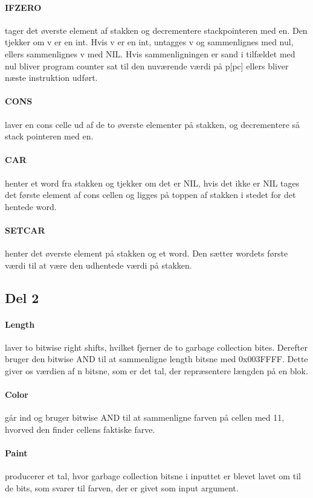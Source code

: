 \paragraph{IFZERO} tager det øverste element af stakken og decrementere stackpointeren med en. Den tjekker om v er en int. Hvis v er en int, untagges v og sammenlignes med nul, ellers sammenlignes v med NIL. Hvis sammenligningen er sand i tilfældet med nul bliver program counter sat til den nuværende værdi på p[pc] ellers bliver næste instruktion udført.
\paragraph{CONS} laver en cons celle ud af de to øverste elementer på stakken, og decrementere så stack pointeren med en.
\paragraph{CAR} henter et word fra stakken og tjekker om det er NIL, hvis det ikke er NIL tages det første element af cons cellen og ligges på toppen af stakken i stedet for det hentede word.
\paragraph{SETCAR} henter det øverste element på stakken og et word. Den sætter wordets første værdi til at være den udhentede værdi på stakken.

\subsection{Del 2}
\label{O1_2}
\paragraph{Length} laver to bitwise right shifts, hvilket fjerner de to garbage collection bites. Derefter bruger den bitwise AND til at sammenligne length bitsne med 0x003FFFF. Dette giver os værdien af n bitsne, som er det tal, der repræsentere længden på en blok.
\paragraph{Color} går ind og bruger bitwise AND til at sammenligne farven på cellen med 11, hvorved den finder cellens faktiske farve.
\paragraph{Paint} producerer et tal, hvor garbage collection bitsne i inputtet er blevet lavet om til de bits, som svarer til farven, der er givet som input argument.

